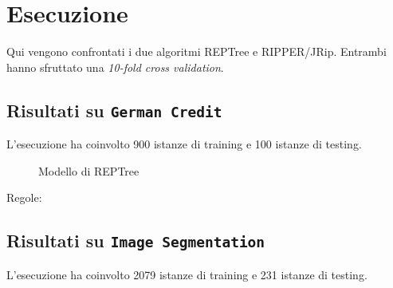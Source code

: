 \chapter{Esecuzione}
\label{ch:results}
Qui vengono confrontati i due algoritmi REPTree e RIPPER/JRip. Entrambi hanno sfruttato una \textit{10-fold cross validation}.

\section{Risultati su \texttt{German Credit}}

\normalsize L'esecuzione ha coinvolto 900 istanze di training e 100 istanze di testing.

\begin{mdframed}[frametitle=Esecuzione REPTree]
	\footnotesize
\end{mdframed}

%

\begin{figure}
	\caption{Modello di REPTree}
\end{figure}

\pagebreak

\begin{mdframed}[frametitle=Esecuzione JRip]
	\footnotesize
\end{mdframed}

%

\noindent
\normalsize Regole:
\footnotesize

\pagebreak

\section{Risultati su \texttt{Image Segmentation}}

\normalsize L'esecuzione ha coinvolto 2079 istanze di training e 231 istanze di testing.


